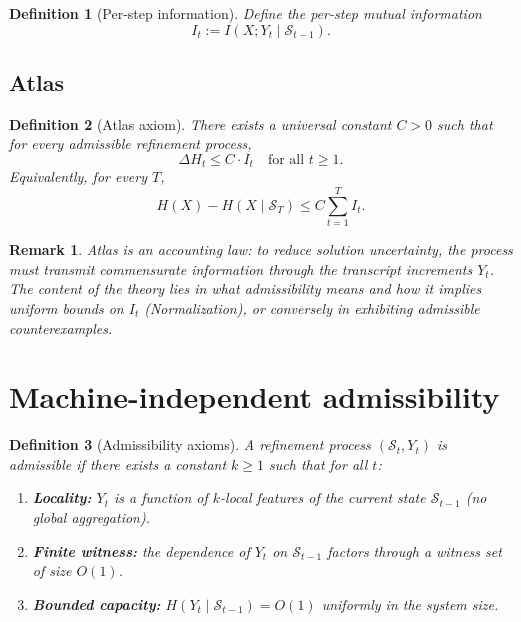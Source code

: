 \documentclass[11pt]{article}
\newtheorem{definition}{Definition}
\newtheorem{remark}{Remark}
\begin{document}
\begin{definition}[Per-step information]
Define the per-step mutual information
\[
I_t := I(X;Y_t \mid \mathcal S_{t-1}).
\]
\end{definition}

\subsection{Atlas}

\begin{definition}[Atlas axiom]
There exists a universal constant $C>0$ such that for every \emph{admissible} refinement process,
\begin{equation}\label{eq:atlas-step}
\Delta H_t \le C \cdot I_t \quad\text{for all }t\ge 1.
\end{equation}
Equivalently, for every $T$,
\begin{equation}\label{eq:atlas-sum}
H(X) - H(X\mid \mathcal S_T) \le C \sum_{t=1}^T I_t.
\end{equation}
\end{definition}

\begin{remark}
Atlas is an accounting law: to reduce solution uncertainty, the process must transmit commensurate information through
the transcript increments $Y_t$. The content of the theory lies in what \emph{admissibility} means and how it implies
uniform bounds on $I_t$ (Normalization), or conversely in exhibiting admissible counterexamples.
\end{remark}

\section{Machine-independent admissibility}

\begin{definition}[Admissibility axioms]\label{def:admiss}
A refinement process $(\mathcal S_t, Y_t)$ is \emph{admissible} if there exists a constant $k\ge 1$ such that for all $t$:
\begin{enumerate}
\item \textbf{Locality:} $Y_t$ is a function of $k$-local features of the current state $\mathcal S_{t-1}$ (no global aggregation).
\item \textbf{Finite witness:} the dependence of $Y_t$ on $\mathcal S_{t-1}$ factors through a witness set of size $O(1)$.
\item \textbf{Bounded capacity:} $H(Y_t \mid \mathcal S_{t-1}) = O(1)$ uniformly in the system size.
\end{enumerate}
\end{definition}
\end{document}
